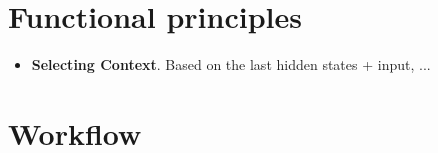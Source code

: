 \documentclass[a4paper]{twentysecondcv} %
\begin{document}




	




\makeprofile %


\section{Functional principles}

\begin{itemize}	
	\item \textbf{Selecting Context}. Based on the last hidden states + input, ... 
\end{itemize}



\section{Workflow}

\begin{twenty} %
	
\end{twenty}
\end{document}
